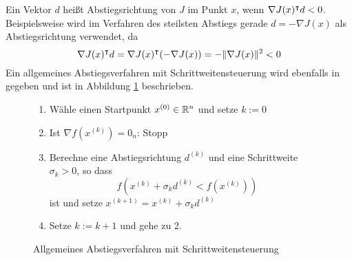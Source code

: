 

 Ein Vektor $d$ heißt Abstiegsrichtung von $J$ im Punkt $x$, wenn $\nabla J(x)^\intercal d<0$. Beispielsweise wird im Verfahren des steilsten Abstiegs gerade $d=- \nabla J(x)$ als Abstiegsrichtung verwendet, da 
\[
\nabla J(x)^\intercal d = \nabla J(x)^\intercal (-\nabla J(x)) = - \|\nabla J(x)\|^2 <0                                                                                                                                                                                                                                                                        \]
Ein allgemeines Abstiegsverfahren mit Schrittweitensteuerung wird ebenfalls in \cite[S. 69, Verfahren 4.1.4]{alt2002nichtlineare} gegeben und ist in Abbildung \ref{alg:genSteepestDescent} beschrieben.
\begin{figure}[H]
\begin{framed}
 \begin{enumerate}
  \item Wähle einen Startpunkt $x^{(0)}\in \mathbb{R}^n$ und setze $k:=0$
  \item Ist $\nabla f(x^{(k)})=0_n$: Stopp
  \item Berechne eine Abstiegsrichtung $d^{(k)}$ und eine Schrittweite $\sigma_k>0$, so dass
  \[
   f(x^{(k)} + \sigma_k d^{(k)} < f(x^{(k)}))
  \]
  ist und setze $x^{(k+1)} = x^{(k)}+\sigma_k d^{(k)}$
  \item Setze $k:=k+1$ und gehe zu 2.
 \end{enumerate}
\end{framed}
\caption{Allgemeines Abstiegsverfahren mit Schrittweitensteuerung}
\label{alg:genSteepestDescent}
\end{figure}

